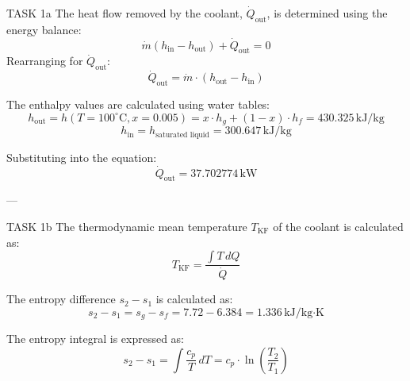 TASK 1a  
The heat flow removed by the coolant, \( \dot{Q}_{\text{out}} \), is determined using the energy balance:  
\[
\dot{m}(h_{\text{in}} - h_{\text{out}}) + \dot{Q}_{\text{out}} = 0
\]  
Rearranging for \( \dot{Q}_{\text{out}} \):  
\[
\dot{Q}_{\text{out}} = \dot{m} \cdot (h_{\text{out}} - h_{\text{in}})
\]  

The enthalpy values are calculated using water tables:  
\[
h_{\text{out}} = h(T = 100^\circ\text{C}, x = 0.005) = x \cdot h_g + (1 - x) \cdot h_f = 430.325 \, \text{kJ/kg}
\]  
\[
h_{\text{in}} = h_{\text{saturated liquid}} = 300.647 \, \text{kJ/kg}
\]  

Substituting into the equation:  
\[
\dot{Q}_{\text{out}} = 37.702774 \, \text{kW}
\]  

---

TASK 1b  
The thermodynamic mean temperature \( T_{\text{KF}} \) of the coolant is calculated as:  
\[
T_{\text{KF}} = \frac{\int T \, dQ}{\dot{Q}}
\]  

The entropy difference \( s_2 - s_1 \) is calculated as:  
\[
s_2 - s_1 = s_g - s_f = 7.72 - 6.384 = 1.336 \, \text{kJ/kg·K}
\]  

The entropy integral is expressed as:  
\[
s_2 - s_1 = \int \frac{c_p}{T} \, dT = c_p \cdot \ln \left( \frac{T_2}{T_1} \right)
\]  

